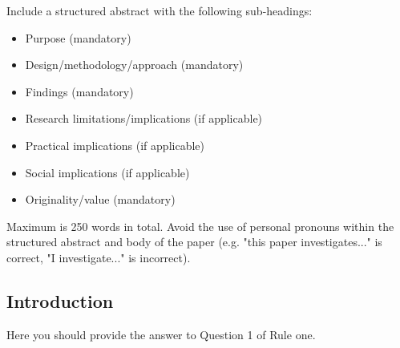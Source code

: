 \documentclass{article}
\begin{document}
Include a structured abstract with the following sub-headings:
\begin{itemize}
\item Purpose (mandatory) 
\item Design/methodology/approach (mandatory)
\item  Findings (mandatory) 
\item Research limitations/implications (if applicable)
\item Practical implications (if applicable) 
\item Social implications (if applicable)
\item Originality/value (mandatory) 
\end{itemize}
Maximum is 250 words in total.  Avoid the use of personal pronouns
within the structured abstract and body of the paper (e.g. "this paper
investigates..." is correct, "I investigate..." is incorrect).

\subsection{Introduction}
\label{sec:introduction}

Here you should provide the answer to Question 1 of Rule one. 
\end{document}
